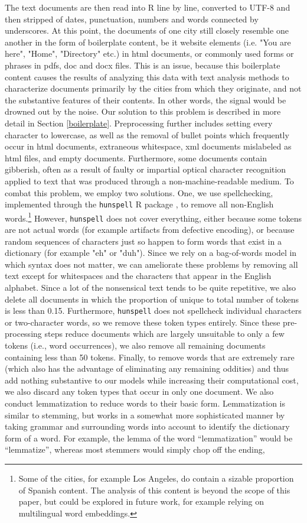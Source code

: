 \documentclass[11pt]{article}
\begin{document}
The text documents are then read into R line by line, converted to UTF-8 and then stripped of dates, punctuation, numbers and words connected by underscores. At this point, the documents of one city still closely resemble one another in the form of boilerplate content, be it website elements (i.e. "You are here", "Home", "Directory" etc.) in html documents, or commonly used forms or phrases in pdfs, doc and docx files. This is an issue, because this boilerplate content causes the results of analyzing this data with text analysis methods to characterize documents primarily by the cities from which they originate, and not the substantive features of their contents. In other words, the signal would be drowned out by the noise. Our solution to this problem is described in more detail in Section \ref{boilerplate}.
Preprocessing further includes setting every character to lowercase, as well as the removal of bullet points which frequently occur in html documents, extraneous whitespace, xml documents mislabeled as html files, and empty documents. Furthermore, some documents contain gibberish, often as a result of faulty or impartial optical character recognition applied to text that was produced through a non-machine-readable medium. To combat this problem, we employ two solutions. One, we use spellchecking, implemented through the \texttt{hunspell} R package \citep{hunspell}, to remove all non-English words.\footnote{Some of the cities, for example Los Angeles, do contain a sizable proportion of Spanish content. The analysis of this content is beyond the scope of this paper, but could be explored in future work, for example relying on multilingual word embeddings.} However, \texttt{hunspell} does not cover everything, either because some tokens are not actual words (for example artifacts from defective encoding), or because random sequences of characters just so happen to form words that exist in a dictionary (for example "eh" or "duh"). Since we rely on a bag-of-words model in which syntax does not matter, we can ameliorate these problems by removing all text except for whitespaces and the characters that appear in the English alphabet. Since a lot of the nonsensical text tends to be quite repetitive, we also delete all documents in which the proportion of unique to total number of tokens is less than 0.15. Furthermore, \texttt{hunspell} does not spellcheck individual characters or two-character words, so we remove these token types entirely. Since these pre-processing steps reduce documents which are largely unsuitable to only a few tokens (i.e., word occurrences), we also remove all remaining documents containing less than 50 tokens. Finally, to remove words that are extremely rare (which also has the advantage of eliminating any remaining oddities) and thus add nothing substantive to our models while increasing their computational cost, we also discard any token types that occur in only one document. We also conduct lemmatization to reduce words to their basic form. Lemmatization is similar to stemming, but works in a somewhat more sophisticated manner by taking grammar and surrounding words into account to identify the dictionary form of a word. For example, the lemma of the word ``lemmatization'' would be ``lemmatize'', whereas most stemmers would simply chop off the ending, 
\end{document}
